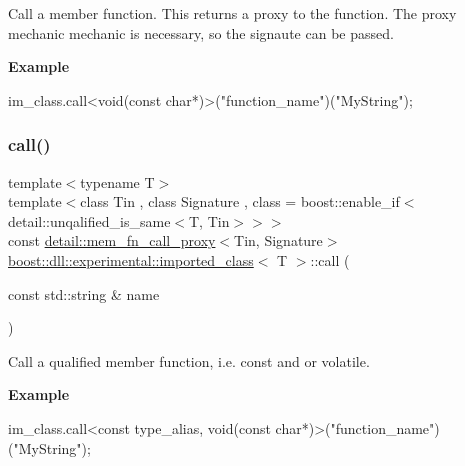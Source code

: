 Call a member function. This returns a proxy to the function. The proxy mechanic mechanic is necessary, so the signaute can be passed.

{\bfseries Example} 


\begin{DoxyCode}
im\_class.call<void(\textcolor{keyword}{const} \textcolor{keywordtype}{char}*)>(\textcolor{stringliteral}{"function\_name"})(\textcolor{stringliteral}{"MyString"});
\end{DoxyCode}
 \mbox{\label{a01664_a87e84e80e9ccb1fd92484cd0303b22b8}} 
\subsubsection{\texorpdfstring{call()}{call()}\hspace{0.1cm}{\footnotesize\ttfamily [2/2]}}
{\footnotesize\ttfamily template$<$typename T$>$ \\
template$<$class Tin , class Signature , class  = boost\+::enable\+\_\+if$<$detail\+::unqalified\+\_\+is\+\_\+same$<$\+T, Tin$>$$>$$>$ \\
const \hyperlink{a01652}{detail\+::mem\+\_\+fn\+\_\+call\+\_\+proxy}$<$Tin, Signature$>$ \hyperlink{a01664}{boost\+::dll\+::experimental\+::imported\+\_\+class}$<$ T $>$\+::call (\begin{DoxyParamCaption}\item[{const std\+::string \&}]{name }\end{DoxyParamCaption})\hspace{0.3cm}{\ttfamily [inline]}}

Call a qualified member function, i.\+e. const and or volatile.

{\bfseries Example} 


\begin{DoxyCode}
im\_class.call<\textcolor{keyword}{const} type\_alias, void(\textcolor{keyword}{const} \textcolor{keywordtype}{char}*)>(\textcolor{stringliteral}{"function\_name"})(\textcolor{stringliteral}{"MyString"});
\end{DoxyCode}
 \mbox{\label{a01664_a382c085143f6c91b0d0a52dd1cb7851a}} 
